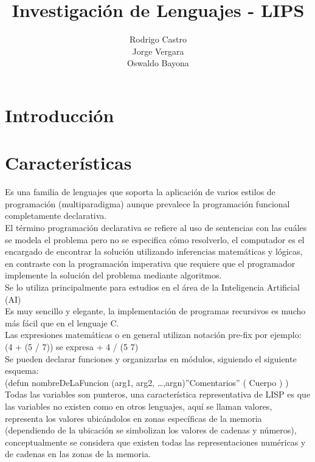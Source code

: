 \documentclass[11pt]{article} %
\title{Investigación de Lenguajes - LIPS}
\author{Rodrigo Castro\\Jorge Vergara\\Oswaldo Bayona}
\begin{document}
\maketitle

\section{Introducción}

\section{Características}

Es una familia de lenguajes que soporta la aplicación de varios estilos de programación 
(multiparadigma) aunque prevalece la programación funcional completamente declarativa.\\

El término programación declarativa se refiere al uso de sentencias con las cuáles se modela el
problema pero no se especifica cómo resolverlo,  el computador es el encargado de encontrar 
la solución utilizando inferencias matemáticas y lógicas, en contraste con la programación
imperativa que requiere que el programador implemente la  solución del problema mediante
algoritmos.\\

Se lo utiliza principalmente para estudios en el área de la Inteligencia Artificial (AI)\\

Es muy sencillo y elegante, la implementación de programas recursivos es mucho más fácil que en el lenguaje C.\\

Las expresiones matemáticas o en general utilizan notación pre-fix por ejemplo:\\
(4 + (5 / 7))  se expresa + 4 / (5  7)\\
Se pueden declarar funciones y organizarlas en módulos, siguiendo el siguiente esquema:\\
	(defun nombreDeLaFuncion (arg1, arg2, …,argn)”Comentarios” (  Cuerpo ) )\\

Todas las variables son punteros, una característica representativa de LISP es que las variables 
no existen como en otros lenguajes, aquí se llaman valores, representa los valores ubicándolos 
en zonas específicas de la memoria (dependiendo de la ubicación se simbolizan los valores
de cadenas y números), conceptualmente se considera que existen todas las representaciones
numéricas y de cadenas en las zonas de la memoria.\\
\end{document}
